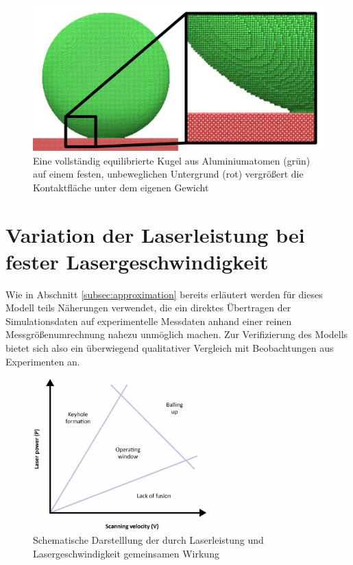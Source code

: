 		\begin{figure}[!ht]
			\centering
			\includegraphics[width=\textwidth]{chapter/main/single/img/equilibrated_sphere.zoom.png}
			\caption{Eine vollständig equilibrierte Kugel aus Aluminiumatomen (grün) auf einem
			festen, unbeweglichen Untergrund (rot) vergrößert die Kontaktfläche unter dem eigenen
			Gewicht}
			\label{fig:equilibrated_sample}
		\end{figure}


\section{Variation der Laserleistung bei fester Lasergeschwindigkeit}
		Wie in Abschnitt \ref{subsec:approximation} bereits erläutert werden für dieses Modell
		teils Näherungen verwendet, die ein direktes Übertragen der Simulationsdaten auf
		experimentelle Messdaten anhand einer reinen Messgrößenumrechnung nahezu unmöglich machen.
		Zur Verifizierung des Modells bietet sich also ein überwiegend qualitativer Vergleich mit
		Beobachtungen aus Experimenten an.

		\begin{figure}[!ht]
			\centering
			\includegraphics[width=0.6\textwidth]{chapter/main/single/img/scheme_graph.png}
			\caption{Schematische Darstelllung der durch Laserleistung und Lasergeschwindigkeit
			gemeinsamen Wirkung \cite{metalam2018how}}
			\label{fig:sceme_graph}
		\end{figure}


